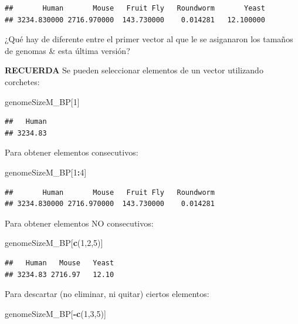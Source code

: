 \documentclass[
]{book}
\newenvironment{Shaded}{\begin{snugshade}}{\end{snugshade}}
\newcommand{\DecValTok}[1]{\textcolor[rgb]{0.00,0.00,0.81}{#1}}
\newcommand{\FunctionTok}[1]{\textcolor[rgb]{0.13,0.29,0.53}{\textbf{#1}}}
\newcommand{\NormalTok}[1]{#1}
\newcommand{\SpecialCharTok}[1]{\textcolor[rgb]{0.81,0.36,0.00}{\textbf{#1}}}
\begin{document}
\begin{verbatim}
##       Human       Mouse   Fruit Fly   Roundworm       Yeast 
## 3234.830000 2716.970000  143.730000    0.014281   12.100000
\end{verbatim}

¿Qué hay de diferente entre el primer vector al que le se asiganaron los tamaños de genomas \& esta última versión?

\textbf{RECUERDA}
Se pueden seleccionar elementos de un vector utilizando corchetes:

\begin{Shaded}
\begin{Highlighting}[]
\NormalTok{genomeSizeM\_BP[}\DecValTok{1}\NormalTok{]}
\end{Highlighting}
\end{Shaded}

\begin{verbatim}
##   Human 
## 3234.83
\end{verbatim}

Para obtener elementos consecutivos:

\begin{Shaded}
\begin{Highlighting}[]
\NormalTok{genomeSizeM\_BP[}\DecValTok{1}\SpecialCharTok{:}\DecValTok{4}\NormalTok{]}
\end{Highlighting}
\end{Shaded}

\begin{verbatim}
##       Human       Mouse   Fruit Fly   Roundworm 
## 3234.830000 2716.970000  143.730000    0.014281
\end{verbatim}

Para obtener elementos NO consecutivos:

\begin{Shaded}
\begin{Highlighting}[]
\NormalTok{genomeSizeM\_BP[}\FunctionTok{c}\NormalTok{(}\DecValTok{1}\NormalTok{,}\DecValTok{2}\NormalTok{,}\DecValTok{5}\NormalTok{)]}
\end{Highlighting}
\end{Shaded}

\begin{verbatim}
##   Human   Mouse   Yeast 
## 3234.83 2716.97   12.10
\end{verbatim}

Para descartar (no eliminar, ni quitar) ciertos elementos:

\begin{Shaded}
\begin{Highlighting}[]
\NormalTok{genomeSizeM\_BP[}\SpecialCharTok{{-}}\FunctionTok{c}\NormalTok{(}\DecValTok{1}\NormalTok{,}\DecValTok{3}\NormalTok{,}\DecValTok{5}\NormalTok{)]}
\end{Highlighting}
\end{Shaded}
\end{document}
